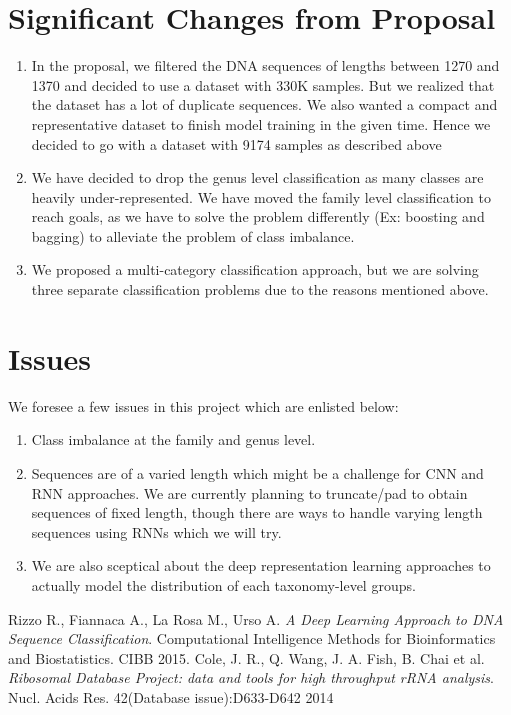 \documentclass[12pt]{article}
\begin{document}
\vspace*{-10mm}

\section{Significant Changes from Proposal}
\begin{enumerate}
    \item In the proposal, we filtered the DNA sequences of lengths between 1270 and 1370 and decided to use a dataset with 330K samples. But we realized that the dataset has a lot of duplicate sequences. We also wanted a compact and representative dataset to finish model training in the given time. Hence we decided to go with a dataset with 9174 samples as described above
    \item We have decided to drop the genus level classification as many classes are heavily under-represented. We have moved the family level classification to reach goals, as we have to solve the problem differently (Ex: boosting and bagging) to alleviate the problem of class imbalance.
    \item We proposed a multi-category classification approach, but we are solving three separate classification problems due to the reasons mentioned above.
\end{enumerate}

\section{Issues}
We foresee a few issues in this project which are enlisted below:
\begin{enumerate}
    \item Class imbalance at the family and genus level.
    \item Sequences are of a varied length which might be a challenge for CNN and RNN approaches. We are currently planning to truncate/pad to obtain sequences of fixed length, though there are ways to handle varying length sequences using RNNs which we will try.
    \item We are also sceptical about the deep representation learning approaches to actually model the distribution of each taxonomy-level groups.
\end{enumerate}

\begin{thebibliography}{9}
    Rizzo R., Fiannaca A., La Rosa M., Urso A.
    \textit{A Deep Learning Approach to DNA Sequence Classification}.
    Computational Intelligence Methods for Bioinformatics and Biostatistics. CIBB 2015.
    Cole, J. R., Q. Wang, J. A. Fish, B. Chai et al.
    \textit{Ribosomal Database Project: data and tools for high throughput rRNA analysis}.
    Nucl. Acids Res. 42(Database issue):D633-D642 2014
\end{thebibliography}
\end{document}
